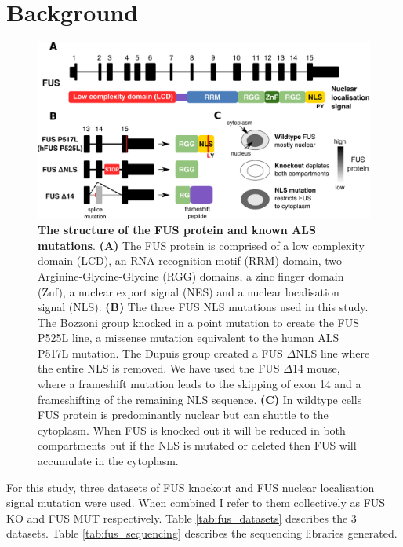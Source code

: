 \clearpage
\section{Background}


\begin{figure}[h!]
	\centering
	\includegraphics[width=\textwidth]{Figures/06_fus_meta/FUS_structure_mutations.png}
	\caption[The structure of the FUS protein and known ALS mutations]{
		\textbf{The structure of the FUS protein and known ALS mutations}.
		\textbf{(A)} The FUS protein is comprised of a low complexity domain (LCD), an RNA recognition motif (RRM) domain, two Arginine-Glycine-Glycine (RGG) domains, a zinc finger domain (Znf), a nuclear export signal (NES) and a nuclear localisation signal (NLS). 
		\textbf{(B)} The three FUS NLS mutations used in this study. The Bozzoni group knocked in a point mutation to create the FUS P525L line, a missense mutation equivalent to the human ALS P517L mutation.  
	The Dupuis group created a FUS $\Delta$NLS line where the entire NLS is removed.  
	We have used the FUS $\Delta$14 mouse, where a frameshift mutation leads to the skipping of exon 14 and a frameshifting of the remaining NLS sequence.
	\textbf{(C)} In wildtype  cells FUS protein is predominantly nuclear but can shuttle to the cytoplasm. When FUS is knocked out it will be reduced in both compartments but if the NLS is mutated or deleted then FUS will accumulate in the cytoplasm.
}
	\label{fig:fus_structure}
\end{figure}


For this study, three datasets of FUS knockout and FUS nuclear localisation signal mutation were used. When combined I refer to them collectively as FUS KO and FUS MUT respectively. Table \ref{tab:fus_datasets} describes the 3 datasets. Table \ref{tab:fus_sequencing} describes the sequencing libraries generated.

